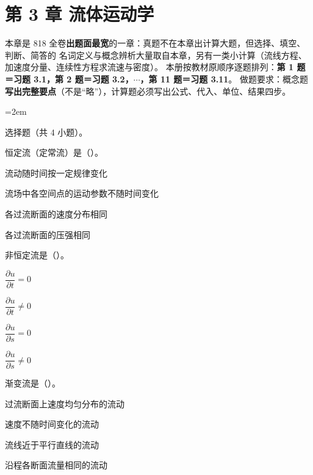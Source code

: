 \chapter*{第 3 章 流体运动学}

\begin{tishi}
本章是 818 全卷\textbf{出题面最宽}的一章：真题不在本章出计算大题，但选择、填空、判断、简答的
名词定义与概念辨析大量取自本章，另有一类小计算（流线方程、加速度分量、连续性方程求流速与密度）。
本册按教材原顺序逐题排列：\textbf{第 1 题＝习题 3.1，第 2 题＝习题 3.2，$\cdots$，第 11 题＝习题 3.11}。
做题要求：概念题\textbf{写出完整要点}（不是“略”），计算题必须写出公式、代入、单位、结果四步。
\end{tishi}

\begin{ti}
\sloppy
\emergencystretch=2em

\item 选择题（共 4 小题）。

\begin{xiaowen}
\item 恒定流（定常流）是（\quad）。

\begin{choices}
\item 流动随时间按一定规律变化
\item 流场中各空间点的运动参数不随时间变化
\item 各过流断面的速度分布相同
\item 各过流断面的压强相同
\end{choices}

\item 非恒定流是（\quad）。

\begin{choices}
\item $\dfrac{\partial u}{\partial t}=0$
\item $\dfrac{\partial u}{\partial t}\neq0$
\item $\dfrac{\partial u}{\partial s}=0$
\item $\dfrac{\partial u}{\partial s}\neq0$
\end{choices}

\item 渐变流是（\quad）。

\begin{choices}
\item 过流断面上速度均匀分布的流动
\item 速度不随时间变化的流动
\item 流线近于平行直线的流动
\item 沿程各断面流量相同的流动
\end{choices}


\end{xiaowen}
\end{ti}
